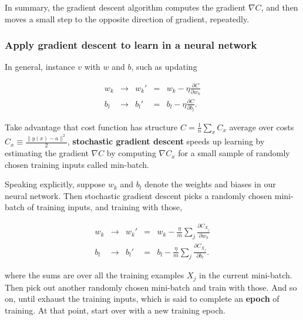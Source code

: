 \documentclass[]{book}
\begin{document}
In summary, the gradient descent algorithm computes the gradient
\(\nabla C\), and then moves a small step to the opposite direction of
gradient, repeatedly.

\subsubsection{Apply gradient descent to learn in a neural
network}\label{apply-gradient-descent-to-learn-in-a-neural-network}

In general, instance \(v\) with \(w\) and \(b\), such as updating

\begin{equation}
\begin{array}{rcccl}
w_k & \rightarrow & w_k' & = & w_k-\eta \frac{\partial C}{\partial w_k} \\
b_l & \rightarrow & b_l' & = & b_l-\eta \frac{\partial C}{\partial b_l}.
\end{array}\label{eq:nnhd-gd-mw}
\end{equation}

Take advantage that cost function has structure
\(\displaystyle C = \frac{1}{n} \sum_x C_x\) average over costs
\(\displaystyle C_x \equiv \frac{\|y(x)-a\|^2}{2}\), \textbf{stochastic
gradient descent} speeds up learning by estimating the gradient
\(\nabla C\) by computing \(\nabla C_x\) for a small sample of randomly
chosen training inputs called min-batch.

Speaking explicitly, suppose \(w_k\) and \(b_l\) denote the weights and
biases in our neural network. Then stochastic gradient descent picks a
randomly chosen mini-batch of training inputs, and training with those,

\begin{equation}
\begin{array}{rcccl}
w_k & \rightarrow & w_k' & = & w_k-\frac{\eta}{m} \sum_j \frac{\partial C_{X_j}}{\partial w_k} \\
b_l & \rightarrow & b_l' & = & b_l-\frac{\eta}{m} \sum_j \frac{\partial C_{X_j}}{\partial b_l}.
\end{array}\label{eq:nnhd-sgd-mw}
\end{equation}

where the sums are over all the training examples \(X_j\) in the current
mini-batch. Then pick out another randomly chosen mini-batch and train
with those. And so on, until exhaust the training inputs, which is said
to complete an \textbf{epoch} of training. At that point, start over
with a new training epoch.
\end{document}
